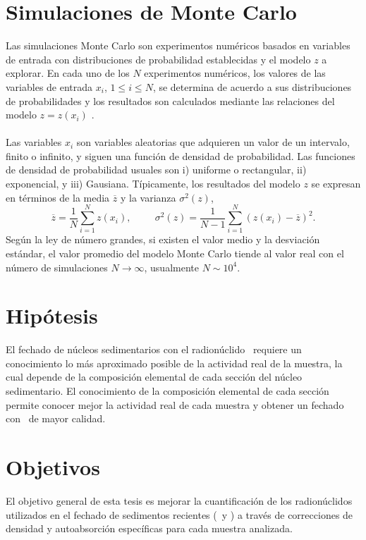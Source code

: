 \section{Simulaciones de Monte Carlo}\label{Secc-MonteCarlo}
Las simulaciones Monte Carlo son experimentos numéricos basados en variables de entrada con distribuciones de probabilidad establecidas y el modelo $z$ a explorar. En cada uno de los $N$ experimentos numéricos, los valores de las variables de entrada $x_i$, $1 \leq i \leq N$, se determina de acuerdo a sus distribuciones de probabilidades y los resultados son calculados mediante las relaciones del modelo $z = z(x_i)$ \cite{cruse1997reliability}. 
\\ \\ 
Las variables $x_i$ son variables aleatorias que adquieren un valor de un intervalo, finito o infinito, y siguen una función de densidad de probabilidad. Las funciones de densidad de probabilidad usuales son i) uniforme o rectangular, ii) exponencial, y iii) Gausiana. Típicamente, los resultados del modelo $z$ se expresan en términos de la media $\overline{z}$ y la varianza $\sigma^2(z)$, \cite{dunn2011exploring}
\begin{equation}
\overline{z} = \dfrac{1}{N}\sum_{i=1}^N z(x_i), \hspace{1cm} \sigma^2(z) = \dfrac{1}{N-1}\sum_{i=1}^N  (z(x_i) - \overline{z})^2.
\end{equation}
Según la ley de número grandes, si existen el valor medio y la desviación estándar, el valor promedio del modelo Monte Carlo tiende al valor real con el número de simulaciones $N\rightarrow \infty$, usualmente $N \sim 10^4$. 
\section{Hipótesis}\label{Sec-Hipotesis}
El fechado de núcleos sedimentarios con el radionúclido \PbCero\, requiere un conocimiento lo más aproximado posible de la actividad real de la muestra, la cual depende de la composición elemental de cada sección del núcleo sedimentario. El conocimiento de la composición elemental de cada sección permite conocer mejor la actividad real de cada muestra y obtener un fechado con \PbCero\, de mayor calidad. 
\section{Objetivos}\label{Sec-Objetivos}
El objetivo general de esta tesis es mejorar la cuantificación de los radionúclidos utilizados en el fechado de sedimentos recientes (\PbCero\, y \PbCuatro) a través de correcciones de densidad y autoabsorción específicas para cada muestra analizada. 
